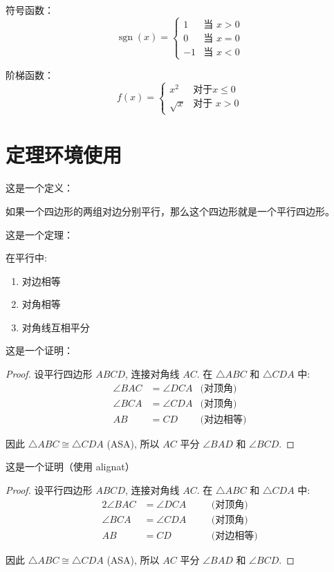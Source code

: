 \documentclass[a4paper,fontsize=8pt]{kaobook}
\begin{document}
符号函数：
\[
\operatorname{sgn}(x) =
\begin{cases}
    1 & \text{当 } x > 0 \\
    0 & \text{当 } x = 0 \\
    -1 & \text{当 } x < 0
\end{cases}
\]

阶梯函数：
\[
f(x) =
\begin{cases}
    x^2 & \text{对于} x \leq 0 \\
    \sqrt{x} & \text{对于 } x > 0
\end{cases}
\]



\section{定理环境使用}

这是一个定义：
\begin{definition}[平行四边形]
    如果一个四边形的两组对边分别平行，那么这个四边形就是一个平行四边形。
\end{definition}


这是一个定理：
\begin{theorem}[平行四边形性质]
    在平行中:
    \begin{enumerate}
        \item 对边相等
        \item 对角相等
        \item 对角线互相平分
    \end{enumerate}
\end{theorem}


这是一个证明：
\begin{proof}
    设平行四边形 $ABCD$, 连接对角线 $AC$.
    在 $\triangle ABC$ 和 $\triangle CDA$ 中:
    \begin{align*}
        \angle BAC &= \angle DCA & \text{(对顶角)} \\
        \angle BCA &= \angle CDA & \text{(对顶角)} \\
        AB &= CD & \text{(对边相等)}
    \end{align*}

    因此 $\triangle ABC \cong \triangle CDA$ (ASA), 所以 $AC$ 平分 $\angle BAD$ 和 $\angle BCD$.
\end{proof}

这是一个证明（使用 alignat）
\begin{proof}
    设平行四边形 $ABCD$, 连接对角线 $AC$.
    在 $\triangle ABC$ 和 $\triangle CDA$ 中:
    \begin{alignat}{2}
        \angle BAC &= \angle DCA & \quad &\text{(对顶角)} \\
        \angle BCA &= \angle CDA &       &\text{(对顶角)} \\
        AB &= CD &                       &\text{(对边相等)}
    \end{alignat}

    因此 $\triangle ABC \cong \triangle CDA$ (ASA), 所以 $AC$ 平分 $\angle BAD$ 和 $\angle BCD$.
\end{proof}
\end{document}
